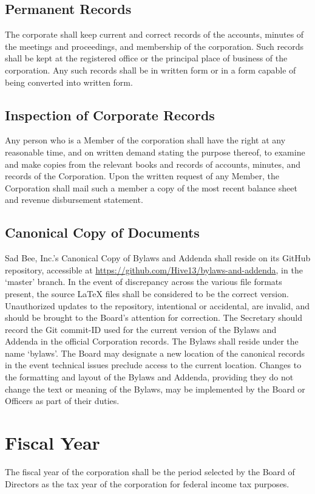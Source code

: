 \documentclass{article}
\begin{document}
  \subsection{Permanent Records}
  The corporate shall keep current and correct records of the accounts, minutes of the
  meetings and proceedings, and membership of the corporation.  Such records shall be kept
  at the registered office or the principal place of business of the corporation.  Any such
  records shall be in written form or in a form capable of being converted into written form.
  \subsection{Inspection of Corporate Records}
  Any person who is a Member of the corporation shall have the right at any reasonable time,
  and on written demand stating the purpose thereof, to examine and make copies from the
  relevant books and records of accounts, minutes, and records of the Corporation.  Upon
  the written request of any Member, the Corporation shall mail such a member a copy of the
  most recent balance sheet and revenue disbursement statement.
  \subsection{Canonical Copy of Documents}
  Sad Bee, Inc.’s Canonical Copy of Bylaws and Addenda shall reside on its GitHub
  repository, accessible at \url{https://github.com/Hive13/bylaws-and-addenda}, in the
  ‘master’ branch. In the event of discrepancy across the various file formats present,
  the source LaTeX files shall be considered to be the correct version. Unauthorized updates
  to the repository, intentional or accidental, are invalid, and should be brought to the
  Board’s attention for correction. The Secretary should record the Git commit-ID used for the
  current version of the Bylaws and Addenda in the official Corporation records. The Bylaws shall
  reside under the name ‘bylaws’.
  The Board may designate a new location of the canonical records in the event technical issues
  preclude access to the current location. Changes to the formatting and layout of the Bylaws
  and Addenda, providing they do not change the text or meaning of the Bylaws, may be implemented
  by the Board or Officers as part of their duties.
\section{Fiscal Year}
  The fiscal year of the corporation shall be the period selected by the Board of Directors as
  the tax year of the corporation for federal income tax purposes.
\end{document}
